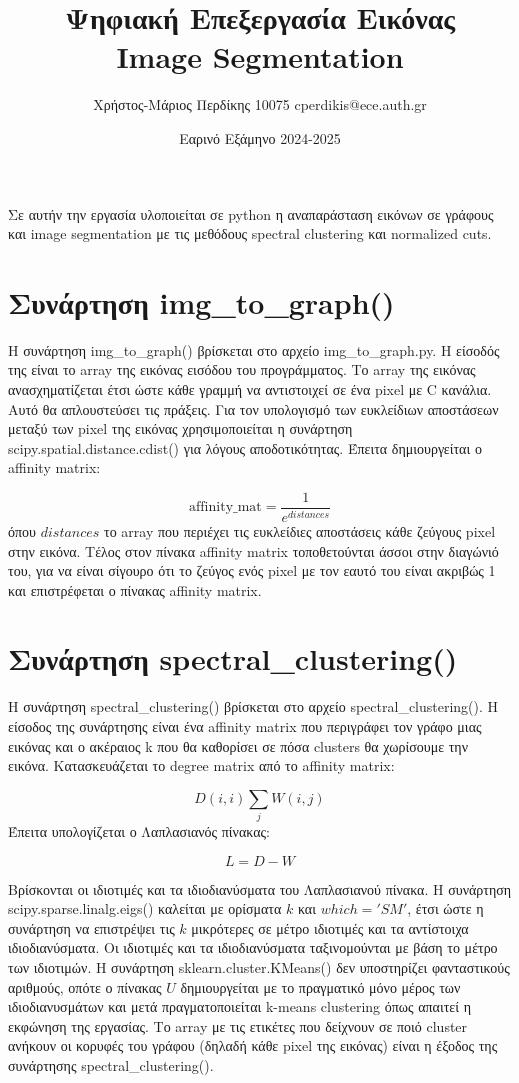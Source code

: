 \documentclass{article}
\title{Ψηφιακή Επεξεργασία Εικόνας \\ Image Segmentation}
\date{Εαρινό Εξάμηνο 2024-2025}
\author{Χρήστος-Μάριος Περδίκης 10075 cperdikis@ece.auth.gr}
\begin{document}
\maketitle
Σε αυτήν την εργασία υλοποιείται σε python η αναπαράσταση εικόνων σε γράφους και image
segmentation με τις μεθόδους spectral clustering και normalized cuts.


\section{Συνάρτηση img\_to\_graph()}
Η συνάρτηση img\_to\_graph() βρίσκεται στο αρχείο img\_to\_graph.py. Η είσοδός της
είναι το array της εικόνας εισόδου του προγράμματος. Το array της εικόνας 
ανασχηματίζεται έτσι ώστε κάθε γραμμή να αντιστοιχεί σε ένα pixel με C κανάλια.
Αυτό θα απλουστεύσει τις πράξεις. Για τον υπολογισμό των ευκλείδιων αποστάσεων 
μεταξύ των pixel της εικόνας χρησιμοποιείται η συνάρτηση scipy.spatial.distance.cdist()
για λόγους αποδοτικότητας. Έπειτα δημιουργείται ο affinity matrix:

\begin{equation}
    \text{affinity\_mat} = \frac{1}{e^{distances}}
\end{equation}
όπου $distances$ το array που περιέχει τις ευκλείδιες αποστάσεις κάθε ζεύγους
pixel στην εικόνα. Τέλος στον πίνακα affinity matrix τοποθετούνται άσσοι στην
διαγώνιό του, για να είναι σίγουρο ότι το ζεύγος ενός pixel με τον εαυτό του
είναι ακριβώς 1 και επιστρέφεται ο πίνακας affinity matrix.

\section{Συνάρτηση spectral\_clustering()}
Η συνάρτηση spectral\_clustering() βρίσκεται στο αρχείο spectral\_clustering().
Η είσοδος της συνάρτησης είναι ένα affinity matrix που περιγράφει τον γράφο μιας
εικόνας και ο ακέραιος k που θα καθορίσει σε πόσα clusters θα χωρίσουμε την εικόνα.
Κατασκευάζεται το degree matrix από το affinity matrix:

\begin{equation}
    D(i, i) \sum_j W(i, j)
\end{equation}
Έπειτα υπολογίζεται ο Λαπλασιανός πίνακας:

\begin{equation}
    L = D - W
\end{equation}

Βρίσκονται οι ιδιοτιμές και τα ιδιοδιανύσματα του Λαπλασιανού πίνακα. Η 
συνάρτηση scipy.sparse.linalg.eigs() καλείται με ορίσματα $k$ και 
$which='SM'$, έτσι ώστε η συνάρτηση να επιστρέψει τις $k$ μικρότερες σε μέτρο
ιδιοτιμές και τα αντίστοιχα ιδιοδιανύσματα. Οι ιδιοτιμές και τα ιδιοδιανύσματα
ταξινομούνται με βάση το μέτρο των ιδιοτιμών. Η συνάρτηση sklearn.cluster.KMeans()
δεν υποστηρίζει φανταστικούς αριθμούς, οπότε ο πίνακας $U$ δημιουργείται με
το πραγματικό μόνο μέρος των ιδιοδιανυσμάτων και μετά πραγματοποιείται k-means 
clustering όπως απαιτεί η εκφώνηση της εργασίας. Το array με τις ετικέτες που 
δείχνουν σε ποιό cluster ανήκουν οι κορυφές του γράφου (δηλαδή κάθε pixel της
εικόνας) είναι η έξοδος της συνάρτησης spectral\_clustering().
\end{document}
